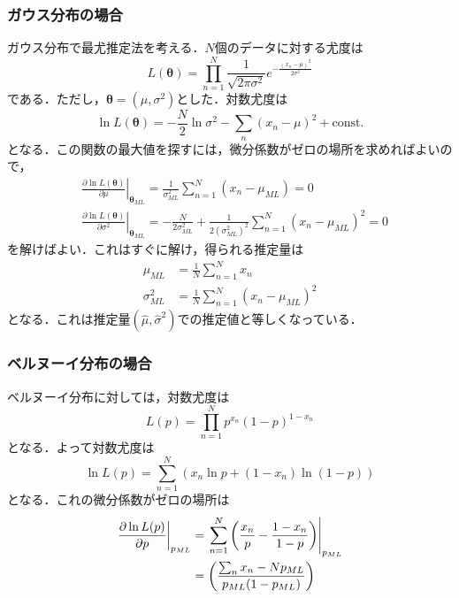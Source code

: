 \documentclass[a4paper,11pt]{jsreport}
\begin{document}
\subsubsection{ガウス分布の場合}
ガウス分布で最尤推定法を考える．$N$個のデータに対する尤度は
\begin{equation}
  L(\bm{\theta})
  = \prod_{n=1}^N \frac{1}{\sqrt{2 \pi \sigma^2}} e^{-\frac{(x_n - \mu)^2}{2 \sigma^2}}
\end{equation}
である．ただし，$\bm{\theta} = (\mu, \sigma^2)$とした．対数尤度は
\begin{equation}
  \ln{L(\bm{\theta})}
  = -\frac{N}{2} \ln{\sigma^2} - \sum_{n} (x_n - \mu)^2 + \text{const.}
\end{equation}
となる．この関数の最大値を探すには，微分係数がゼロの場所を求めればよいので，
\begin{align}
& \left.\frac{\partial \ln L(\bm{\theta})}{\partial \mu}\right|_{\bm{\theta}_{ML}}
= \frac{1}{\sigma_{M L}^2} \sum_{n=1}^N\left(x_n-\mu_{M L}\right) = 0 \\
& \left.\frac{\partial \ln L(\bm{\theta})}{\partial \sigma^2}\right|_{\bm{\theta}_{ML}}
= -\frac{N}{2 \sigma_{M L}^2}+\frac{1}{2\left(\sigma_{M L}^2\right)^2} \sum_{n=1}^N\left(x_n-\mu_{M L}\right)^2 = 0
\end{align}
を解けばよい．これはすぐに解け，得られる推定量は
\begin{align}
  \mu_{ML}
  &= \frac{1}{N} \sum_{n=1}^{N} x_n \\
  \sigma_{ML}^2
  &= \frac{1}{N} \sum_{n=1}^{N} (x_n - \mu_{ML})^2
\end{align}
となる．これは推定量$(\hat{\mu}, \hat{\sigma}^2)$での推定値と等しくなっている．

\subsubsection{ベルヌーイ分布の場合}
ベルヌーイ分布に対しては，対数尤度は
\begin{equation}
  L(p) = \prod_{n=1}^{N} p^{x_n} (1 - p)^{1 - x_n}
\end{equation}
となる．よって対数尤度は
\begin{equation}
  \ln{L(p)} = \sum_{n=1}^{N} (x_n \ln{p} + (1 - x_n)\ln{(1 - p)})
\end{equation}
となる．これの微分係数がゼロの場所は
\begin{align}
  \left.\frac{\partial \ln{L(p)}}{\partial p}\right|_{p_{ML}}
  &= \left.\sum_{n=1}^{N} \left(\frac{x_n}{p} - \frac{1 - x_n}{1 - p}\right) \right|_{p_{ML}} \notag \\
  &= \left(\frac{\sum_n x_n - N p_{ML}}{p_{ML}(1-p_{ML})}\right)
\end{align}
\end{document}
